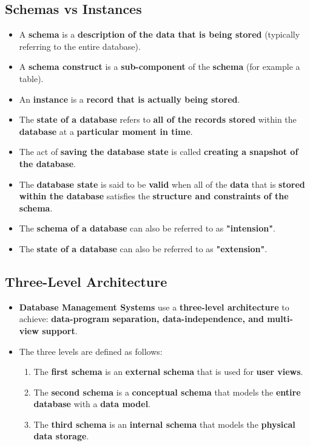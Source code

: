 \documentclass{article}
\begin{document}
    \subsection*{Schemas vs Instances}
    \begin{itemize}
        \item A \textbf{schema} is a \textbf{description of the data that is being stored} (typically referring to the entire database).
        \item A \textbf{schema construct} is a \textbf{sub-component} of the \textbf{schema} (for example a table).
        \item An \textbf{instance} is a \textbf{record that is actually being stored}.
        \item The \textbf{state of a database} refers to \textbf{all of the records stored} within the \textbf{database} at a \textbf{particular moment in time}.
        \item The act of \textbf{saving the database state} is called \textbf{creating a snapshot of the database}.
        \item The \textbf{database state} is said to be \textbf{valid} when all of the \textbf{data} that is \textbf{stored within the database} satisfies the \textbf{structure and constraints of the schema}.
        \item The \textbf{schema of a database} can also be referred to as \textbf{"intension"}.
        \item The \textbf{state of a database} can also be referred to as \textbf{"extension"}.
    \end{itemize}

    \subsection*{Three-Level Architecture}
    \begin{itemize}
        \item \textbf{Database Management Systems} use a \textbf{three-level architecture} to achieve: \textbf{data-program separation, data-independence, and multi-view support}.
        \item The three levels are defined as follows:
        \begin{enumerate}
            \item The \textbf{first schema} is an \textbf{external schema} that is used for \textbf{user views}.
            \item The \textbf{second schema} is a \textbf{conceptual schema} that models the \textbf{entire database} with a \textbf{data model}.
            \item The \textbf{third schema} is an \textbf{internal schema} that models the \textbf{physical data storage}.
        \end{enumerate}
    \end{itemize}
\end{document}
